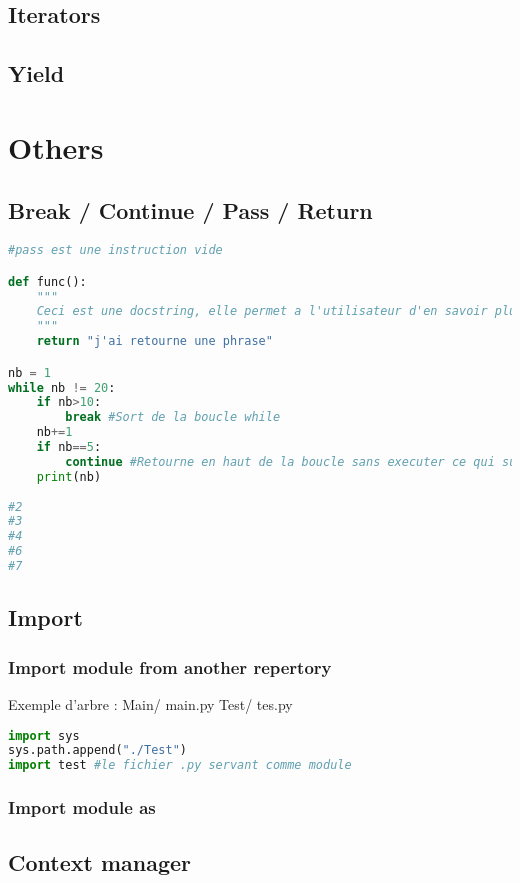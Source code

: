 \documentclass[a4paper, 12pt]{article}
\begin{document}
\subsection{Iterators}
\subsection{Yield}

\newpage
\section{Others}
\subsection{Break / Continue / Pass / Return}
\label{subsec:BCPR}
\begin{lstlisting}[language=Python]
#pass est une instruction vide

def func():
	"""
	Ceci est une docstring, elle permet a l'utilisateur d'en savoir plus sur la fonction en faisait help(func)
	"""
	return "j'ai retourne une phrase"

nb = 1
while nb != 20:
	if nb>10:
		break #Sort de la boucle while
	nb+=1
	if nb==5:
		continue #Retourne en haut de la boucle sans executer ce qui suit	
	print(nb)
	
#2
#3
#4
#6
#7
\end{lstlisting}

\subsection{Import}
\label{subsec:Import}
\subsubsection{Import module from another repertory}
Exemple d'arbre :
Main/
	main.py
	Test/
		tes.py

\begin{lstlisting}[language=Python]
import sys
sys.path.append("./Test")
import test #le fichier .py servant comme module
\end{lstlisting}

\subsubsection{Import module as}
\label{As}
\subsection{Context manager}
\label{subsec:ContextManager}
\end{document}

